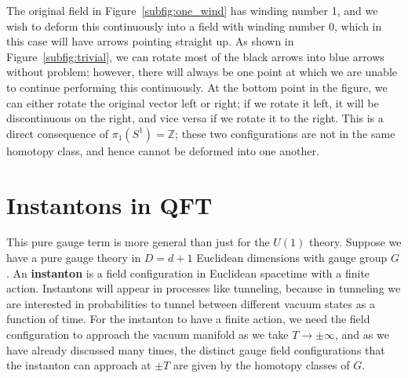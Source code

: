 \documentclass[11pt, oneside]{article}   	%
\theoremstyle{definition}
\begin{document}
The original field in Figure~\ref{subfig:one_wind} has winding number 1, and we wish to deform this continuously into a field with winding 
number 0, which in this case will have arrows pointing straight up. As shown in Figure~\ref{subfig:trivial}, we can rotate most of the black 
arrows into blue arrows without problem; however, there will always be one point at which we are unable to continue performing this 
continuously. At the bottom point in the figure, we can either rotate the original vector left or right; if we rotate it left, it will be discontinuous on 
the right, and vice versa if we rotate it to the right. This is a direct consequence of $\pi_1(S^1) = \mathbb Z$; these two configurations 
are not in the same homotopy class, and hence cannot be deformed into one another. 

\newpage
\section{Instantons in QFT}
This pure gauge term is more general than just for the $U(1)$ theory. Suppose we have a pure gauge theory in $D = d + 1$ Euclidean 
dimensions with gauge group $G$. An \textbf{instanton} is a field configuration in Euclidean spacetime with a finite action.  
Instantons will appear in processes like tunneling, because in tunneling we are interested in probabilities to tunnel between different 
vacuum states as a function of time. For the instanton to have a finite action, we need the field configuration to approach the vacuum 
manifold as we take $T\rightarrow\pm\infty$, and as we have already discussed many times, the distinct gauge field configurations that 
the instanton can approach at $\pm T$ are given by the homotopy classes of $G$. 
\end{document}
